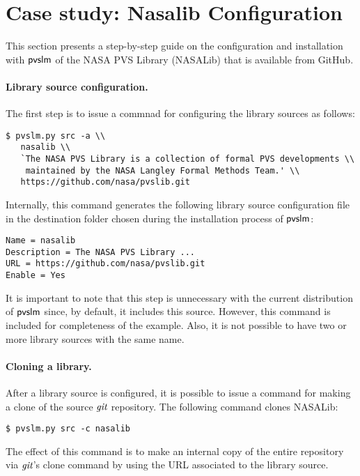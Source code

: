 \section{Case study: Nasalib Configuration}
\label{sec.nasalib}

This section presents a step-by-step guide on the configuration and
installation with $\textsf{pvslm}$ of the NASA PVS Library (NASALib) that is
available from GitHub.

\paragraph{Library source configuration.}
The first step is to issue a commnad for configuring the library sources
as follows:
%
\begin{verbatim}
$ pvslm.py src -a \\
   nasalib \\
   `The NASA PVS Library is a collection of formal PVS developments \\
    maintained by the NASA Langley Formal Methods Team.' \\
   https://github.com/nasa/pvslib.git
\end{verbatim}
%
Internally, this command generates the following library source
configuration file in the destination folder chosen during the
installation process of $\textsf{pvslm}$:
%
\begin{verbatim}
Name = nasalib
Description = The NASA PVS Library ...
URL = https://github.com/nasa/pvslib.git
Enable = Yes
\end{verbatim}

It is important to note that this step is unnecessary with the current
distribution of $\textsf{pvslm}$ since, by default, it includes this source.
However, this command is included for completeness of the
example. Also, it is not possible to have two or more library sources
with the same name.

\paragraph{Cloning a library.} After a library source
is configured, it is possible to issue a command for making a clone of
the source $\textit{git}$ repository. The following command clones NASALib:
%
\begin{verbatim}
$ pvslm.py src -c nasalib
\end{verbatim}
%
The effect of this command is to make an internal copy of the entire
repository via $\textit{git}$'s clone command by using the URL associated to
the library source.

